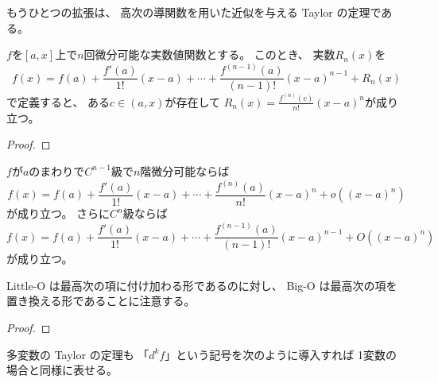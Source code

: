 \documentclass[report]{jlreq}
\begin{document}
もうひとつの拡張は、
高次の導関数を用いた近似を与える Taylor の定理である。

\begin{theorem}
    $f$を$[a, x]$上で$n$回微分可能な実数値関数とする。
    このとき、
    実数$R_n(x)$を
    \begin{equation}
        f(x)
            =
                f(a)
                + \frac{f'(a)}{1!} (x - a)
                + \cdots
                + \frac{f^{(n - 1)}(a)}{(n - 1)!} (x - a)^{n - 1}
                + R_n(x)
    \end{equation}
    で定義すると、
    ある$c \in (a, x)$が存在して
    $R_n(x) = \frac{f^{(n)}(c)}{n!} (x - a)^n$が成り立つ。
\end{theorem}

\begin{proof}
    \TODO{}
\end{proof}

\begin{theorem}
    $f$が$a$のまわりで$C^{n - 1}$級で$n$階微分可能ならば
    \begin{equation}
        f(x)
            =
                f(a)
                + \frac{f'(a)}{1!} (x - a)
                + \cdots
                + \frac{f^{(n)}(a)}{n!} (x - a)^n
                + o((x - a)^n)
    \end{equation}
    が成り立つ。
    さらに$C^n$級ならば
    \begin{equation}
        f(x)
            =
                f(a)
                + \frac{f'(a)}{1!} (x - a)
                + \cdots
                + \frac{f^{(n - 1)}(a)}{(n - 1)!} (x - a)^{n - 1}
                + O((x - a)^n)
    \end{equation}
    が成り立つ。
\end{theorem}

Little-O は最高次の項に付け加わる形であるのに対し、
Big-O は最高次の項を置き換える形であることに注意する。

\begin{proof}
    \TODO{}
\end{proof}

多変数の Taylor の定理も
「$d^k f$」という記号を次のように導入すれば
1変数の場合と同様に表せる。
\end{document}
